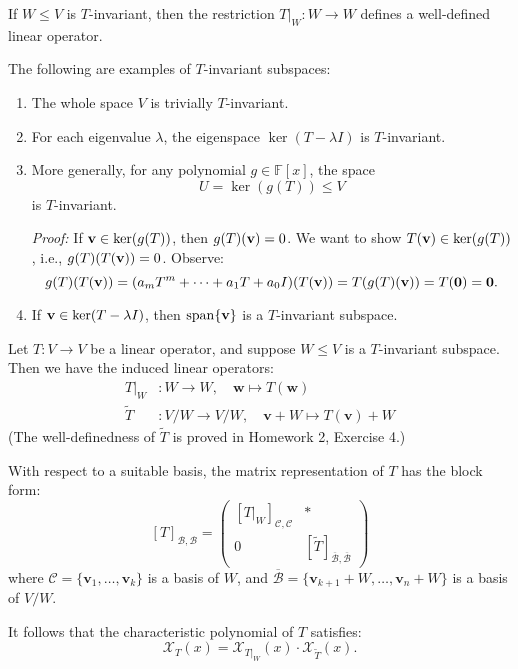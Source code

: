 \begin{remark}
If \( W \leq V \) is \( T \)-invariant, then the restriction \( T|_W : W \to W \) defines a well-defined linear operator.
\end{remark}

\begin{example}\label{ex:invariant-subspace}
The following are examples of \( T \)-invariant subspaces:
\begin{enumerate}
    \item The whole space \( V \) is trivially \( T \)-invariant.
    \item For each eigenvalue \( \lambda \), the eigenspace \( \ker(T - \lambda I) \) is \( T \)-invariant.
    \item More generally, for any polynomial \( g \in \mathbb{F}[x] \), the space
    \[
    U = \ker(g(T)) \leq V
    \]
    is \( T \)-invariant.

    \emph{Proof:} If \( {\bf v} \in \ker(g(T)) \), then \( g(T)({\bf v}) = 0 \). We want to show \( T({\bf v}) \in \ker(g(T)) \), i.e., \( g(T)(T({\bf v})) = 0 \). Observe:
    \[
    g(T)(T({\bf v})) = (a_m T^m + \cdots + a_1 T + a_0 I)(T({\bf v})) = T(g(T)({\bf v})) = T({\bf 0}) = {\bf 0}.
    \]
    \item If \( {\bf v} \in \ker(T - \lambda I) \), then \( \operatorname{span}\{{\bf v}\} \) is a \( T \)-invariant subspace.
\end{enumerate}
\end{example}

\begin{proposition}\label{prop:block-diagonal}
Let \( T : V \to V \) be a linear operator, and suppose \( W \leq V \) is a \( T \)-invariant subspace. Then we have the induced linear operators:
\begin{align}
\left. T \right|_W & : W \to W, \quad \mathbf{w} \mapsto T(\mathbf{w}) \label{eq:restriction-map} \\
\widetilde{T} & : V/W \to V/W, \quad \mathbf{v} + W \mapsto T(\mathbf{v}) + W \label{eq:quotient-map}
\end{align}
(The well-definedness of \( \widetilde{T} \) is proved in Homework 2, Exercise 4.)

With respect to a suitable basis, the matrix representation of \( T \) has the block form:
\[
[T]_{\mathcal{B},\mathcal{B}} =
\begin{pmatrix}
[\left. T \right|_W]_{\mathcal{C}, \mathcal{C}} & * \\
0 & [\widetilde{T}]_{\overline{\mathcal{B}}, \overline{\mathcal{B}}}
\end{pmatrix}
\]
where \( \mathcal{C} = \{ \mathbf{v}_1, \dots, \mathbf{v}_k \} \) is a basis of \( W \), and \( \overline{\mathcal{B}} = \{ \mathbf{v}_{k+1} + W, \dots, \mathbf{v}_n + W \} \) is a basis of \( V/W \).

It follows that the characteristic polynomial of \( T \) satisfies:
\[
\mathcal{X}_T(x) = \mathcal{X}_{\left. T \right|_W}(x) \cdot \mathcal{X}_{\widetilde{T}}(x).
\]
\end{proposition}

